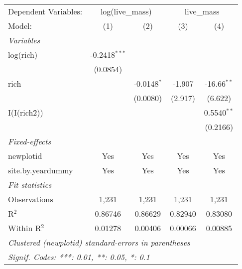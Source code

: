 \begin{tabular}{lcccc}
\tabularnewline\midrule\midrule
Dependent Variables:&\multicolumn{2}{c}{log(live\_mass)}&\multicolumn{2}{c}{live\_mass}\\
Model:&(1) & (2) & (3) & (4)\\
\midrule \emph{Variables}&   &   &   &  \\
log(rich) & -0.2418$^{***}$ &    &    &   \\
  &(0.0854) &    &    &   \\
rich &    & -0.0148$^{*}$ & -1.907 & -16.66$^{**}$\\
  &   & (0.0080) & (2.917) & (6.622)\\
I(I(rich\^2)) &    &    &    & 0.5540$^{**}$\\
  &   &    &    & (0.2166)\\
\midrule \emph{Fixed-effects}&   &   &   &  \\
newplotid & Yes & Yes & Yes & Yes\\
site.by.yeardummy & Yes & Yes & Yes & Yes\\
\midrule \emph{Fit statistics}&  & & & \\
Observations & 1,231&1,231&1,231&1,231\\
R$^2$ & 0.86746&0.86629&0.82940&0.83080\\
Within R$^2$ & 0.01278&0.00406&0.00066&0.00885\\
\midrule\midrule\multicolumn{5}{l}{\emph{Clustered (newplotid) standard-errors in parentheses}}\\
\multicolumn{5}{l}{\emph{Signif. Codes: ***: 0.01, **: 0.05, *: 0.1}}\\
\end{tabular}


